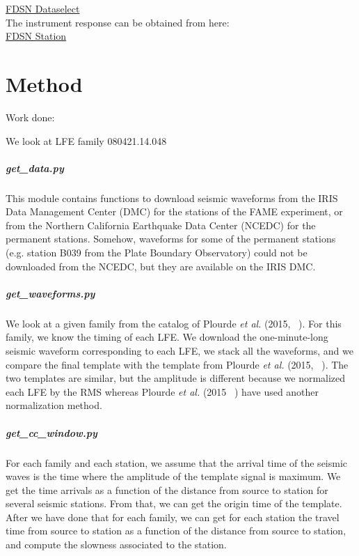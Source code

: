 \documentclass[main.tex]{subfiles}
\begin{document}
\href{http://service.ncedc.org/fdsnws/dataselect/1/#description-box}{FDSN Dataselect} \\

The instrument response can be obtained from here: \\

\href{http://service.ncedc.org/fdsnws/station/1/#description-box}{FDSN Station}

\chapter{Method}

Work done:

We look at LFE family 080421.14.048

\paragraph{get_data.py} This module contains functions to download seismic waveforms from the IRIS Data Management Center (DMC) for the stations of the FAME experiment, or from the Northern California Earthquake Data Center (NCEDC) for the permanent stations. Somehow, waveforms for some of the permanent stations (e.g. station B039 from the Plate Boundary Observatory) could not be downloaded from the NCEDC, but they are available on the IRIS DMC.

\paragraph{get_waveforms.py} We look at a given family from the catalog of Plourde \textit{et al.} (2015, ~\cite{PLO_2015}). For this family, we know the timing of each LFE. We download the one-minute-long seismic waveform corresponding to each LFE, we stack all the waveforms, and we compare the final template with the template from Plourde \textit{et al.} (2015, ~\cite{PLO_2015}). The two templates are similar, but the amplitude is different because we normalized each LFE by the RMS whereas Plourde \textit{et al.} (2015 ~\cite{PLO_2015}) have used another normalization method.

\paragraph{get_cc_window.py} For each family and each station, we assume that the arrival time of the seismic waves is the time where the amplitude of the template signal is maximum. We get the time arrivals as a function of the distance from source to station for several seismic stations. From that, we can get the origin time of the template. After we have done that for each family, we can get for each station the travel time from source to station as a function of the distance from source to station, and compute the slowness associated to the station.
\end{document}

